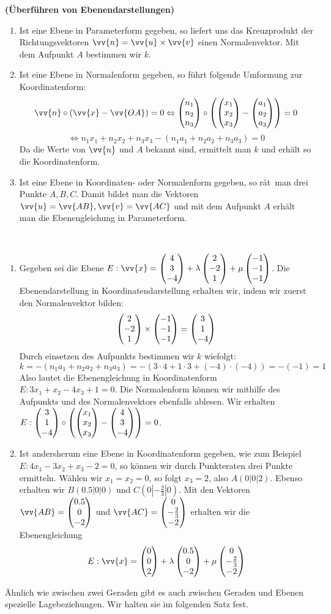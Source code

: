 \documentclass[ngerman, 12pt]{nssheetxea}
\begin{document}
\begin{theorem} \textbf{(Überführen von Ebenendarstellungen)} 
\begin{enumerate}
\item Ist eine Ebene in Parameterform gegeben, so liefert uns das Kreuzprodukt der Richtungsvektoren $\vv{n}=\vv{u} \times \vv{v}$ einen Normalenvektor. Mit dem Aufpunkt $A$ bestimmen wir $k$.
\item Ist eine Ebene in Normalenform gegeben, so führt folgende Umformung zur Koordinatenform:
\[ \vv{n} \circ \mleft( \vv{x}-\vv{OA} \mright) = 0 \Leftrightarrow \colvec[n_1]{n_2}{n_3} \circ \mleft( \colvec[x_1]{x_2}{x_3} - \colvec[a_1]{a_2}{a_3} \mright) = 0 \] \[ \Leftrightarrow n_1x_1+n_2x_2+n_3x_3-(n_1a_1+n_2a_2+n_3a_3)=0\]
Da die Werte von $\vv{n}$ und $A$ bekannt sind, ermittelt man $k$ und erhält so die Koordinatenform.
\item Ist eine Ebene in Koordinaten- oder Normalenform gegeben, so \glqq rät\grqq \ man drei Punkte $A,B,C$. Damit bildet man die Vektoren $\vv{u}=\vv{AB}, \vv{v}=\vv{AC}$ und mit dem Aufpunkt $A$ erhält man die Ebenengleichung in Parameterform.
\end{enumerate}
\end{theorem}

\begin{example} \ 
\begin{enumerate}
\item Gegeben sei die Ebene $E:\vv{x}=\colvec[4]{3}{-4}+\lambda \colvec[2]{-2}{1} + \mu \colvec[-1]{-1}{-1}$. Die Ebenendarstellung in Koordinatendarstellung erhalten wir, indem wir zuerst den Normalenvektor bilden:
\[  \colvec[2]{-2}{1} \times \colvec[-1]{-1}{-1} = \colvec[3]{1}{-4}\]
Durch einsetzen des Aufpunkts bestimmen wir $k$ wiefolgt:
\[ k = -(n_1a_1+n_2a_2+n_3a_3) = - (3\cdot 4 + 1 \cdot 3 + (-4)\cdot (-4)) = - (-1) = 1\]
Also lautet die Ebenengleichung in Koordinatenform $E:3x_1+x_2-4x_3+1=0$. Die Normalenform können wir mithilfe des Aufpunkts und des Normalenvektors ebenfalls ablesen. Wir erhalten $E:\colvec[3]{1}{-4} \circ \mleft(\colvec[x_1]{x_2}{x_3} - \colvec[4]{3}{-4}\mright) = 0$.
\item Ist andersherum eine Ebene in Koordinatenform gegeben, wie zum Beispiel $E: 4x_1 - 3x_2 +x_3 -2= 0$, so können wir durch Punkteraten drei Punkte ermitteln. Wählen wir $x_1=x_2=0$, so folgt $x_3=2$, also $A(0|0|2)$. Ebenso erhalten wir $B(\num{0,5}|0|0)$ und $C(0|-\frac{2}{3}|0)$. Mit den Vektoren $\vv{AB}=\colvec[\num{0,5}]{0}{-2}$ und $\vv{AC}=\colvec[0]{-\frac{2}{3}}{-2}$ erhalten wir die Ebenengleichung 
\[ E:\vv{x}=\colvec[0]{0}{2} + \lambda \colvec[\num{0,5}]{0}{-2} + \mu \colvec[0]{-\frac{2}{3}}{-2}\]
\end{enumerate}
\end{example}
Ähnlich wie zwischen zwei Geraden gibt es auch zwischen Geraden und Ebenen spezielle Lagebeziehungen. Wir halten sie im folgenden Satz fest.
\end{document}
